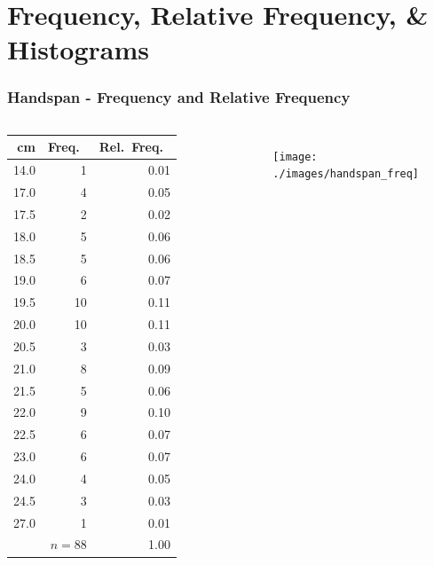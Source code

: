 \section{Frequency, Relative Frequency, \& Histograms}
\begin{frame}
\frametitle{Handspan - Frequency and Relative Frequency}
\footnotesize
\singlespacing


\begin{columns}
\begin{tabular}{rrr}
cm& Freq.\ & Rel.\ Freq.\ \\
\hline
14.0         & 1 &0.01\\
17.0         & 4 &0.05\\
17.5      &  2 &0.02\\
18.0         & 5 &0.06\\
18.5      &  5 &0.06\\
19.0         & 6 &0.07\\
19.5      & 10 &0.11\\
20.0        & 10 &0.11\\
20.5      &  3 &0.03\\
21.0         & 8 &0.09\\
21.5      &  5 &0.06\\
22.0         & 9 &0.10\\
22.5      &  6 &0.07\\
23.0         & 6 &0.07\\
24.0         & 4 &0.05\\
24.5      &  3 &0.03\\
27.0         & 1 &0.01\\
\hline
& $n=88$&1.00
\end{tabular}
\begin{figure}
	\centering
	\texttt{[image: ./images/handspan\_freq]}
\end{figure}
\end{columns}
\end{frame}
%
%
